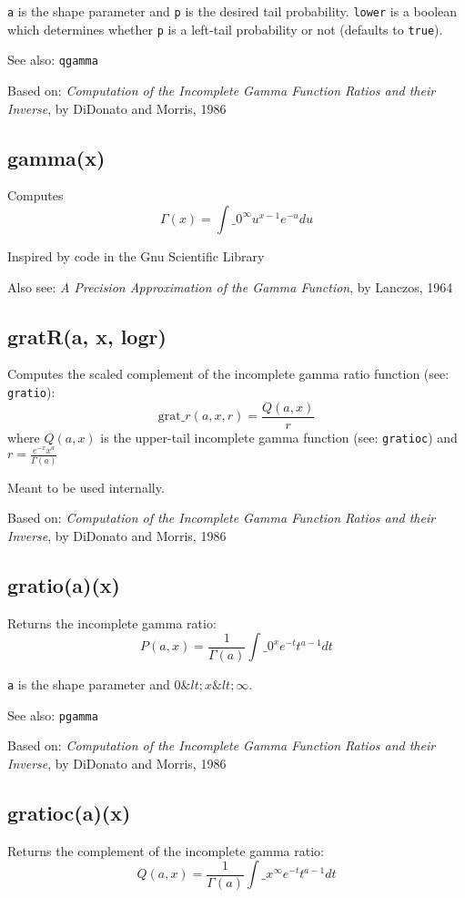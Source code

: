 \documentclass{article}
\begin{document}
\texttt{a} is the shape parameter and \texttt{p} is the desired tail probability.
\texttt{lower} is a boolean which determines whether \texttt{p} is a left-tail
probability or not (defaults to \texttt{true}).


See also: \texttt{qgamma}


Based on:  \emph{Computation of the Incomplete Gamma Function Ratios
and their Inverse}, by DiDonato and Morris, 1986


    \subsection*{gamma(x)}
    Computes $$\Gamma(x) = \int\_0^\infty u^{x-1} e^{-u} du$$


Inspired by code in the Gnu Scientific Library


Also see: \emph{A Precision Approximation of the Gamma Function}, by
Lanczos, 1964


    \subsection*{gratR(a, x, logr)}
    Computes the scaled complement of the incomplete gamma ratio function
(see: \texttt{gratio}): $$\textrm{grat}\_r(a,x,r) =  \frac{Q(a,x)}{r}$$
where
              $Q(a,x)$ is the upper-tail incomplete gamma function
(see: \texttt{gratioc}) and  $r = \frac{e^{-x} x^a}{\Gamma(a)}$


Meant to be used internally.


Based on:   \emph{Computation of the Incomplete Gamma Function Ratios
and their Inverse}, by DiDonato and Morris, 1986


    \subsection*{gratio(a)(x)}
    Returns the incomplete gamma ratio:
$$P(a,x) = \frac{1}{\Gamma(a)} \int\_0^x e^{-t} t^{a-1} dt$$


\texttt{a} is the shape parameter and $0 \&lt; x \&lt; \infty$.


See also: \texttt{pgamma}


Based on:  \emph{Computation of the Incomplete Gamma Function Ratios
and their Inverse}, by DiDonato and Morris, 1986


    \subsection*{gratioc(a)(x)}
    Returns the complement of the incomplete gamma ratio:
$$Q(a,x) = \frac{1}{\Gamma(a)} \int\_x^\infty e^{-t} t^{a-1} dt$$
\end{document}
